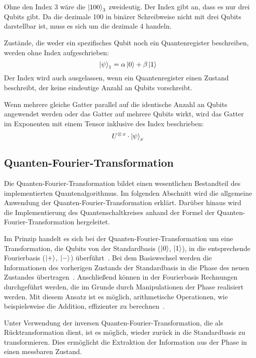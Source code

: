 Ohne den Index 3 wäre die \(\ket{100}_3\) zweideutig. 
Der Index gibt an, dass es nur drei Qubits gibt. 
Da die dezimale 100 in binärer Schreibweise nicht mit drei Qubits darstellbar ist, 
muss es sich um die dezimale 4 handeln.

Zustände, die weder ein spezifisches Qubit noch ein Quantenregister beschreiben, 
werden ohne Index aufgeschrieben:
\[
  \ket{\psi}_1 = \alpha\ket{0} + \beta\ket{1}
  \]
Der Index wird auch ausgelassen, 
wenn ein Quantenregister einen Zustand beschreibt, 
der keine eindeutige Anzahl an Qubits vorschreibt.

\vspace{1em}

Wenn mehrere gleiche Gatter parallel auf die identische Anzahl an Qubits angewendet werden 
oder das Gatter auf mehrere Qubits wirkt, 
wird das Gatter im Exponenten mit einem Tensor inklusive des Index beschrieben:
\[
  U^{\operatorname{\otimes} x} \cdot 
  \ket{\psi}_x
\]


\subsection{Quanten-Fourier-Transformation} \label{Quanten-Fourier-Transformation}
Die Quanten-Fourier-Transformation bildet einen wesentlichen Bestandteil des implementierten Quantenalgorithmus. 
Im folgenden Abschnitt wird die allgemeine Anwendung der Quanten-Fourier-Transformation erklärt.
Darüber hinaus wird die Implementierung des Quantenschaltkreises anhand der Formel der Quanten-Fourier-Transformation hergeleitet.

Im Prinzip handelt es sich bei der Quanten-Fourier-Transformation um eine Transformation,
die Qubits von der Standardbasis (\(\ket{0}\), \(\ket{1}\)),
in die entsprechende Fourierbasis (\(\ket{+}\), \(\ket{-}\)) überführt~\cite[215]{homeister2023quantum215}.
Bei dem Basiswechsel werden die Informationen des vorherigen Zustands der Standardbasis in die Phase des neuen Zustandes übertragen~\cite{Ruiz-Perez2017}.
Anschließend können in der Fourierbasis Rechnungen durchgeführt werden, 
die im Grunde durch Manipulationen der Phase realisiert werden.
Mit diesem Ansatz ist es möglich, arithmetische Operationen, wie beispielsweise 
die Addition, effizienter zu berechnen~\cite{draper2000addition,Ruiz-Perez2017}.

Unter Verwendung der inversen Quanten-Fourier-Transformation, 
die als Rücktransformation dient, ist es möglich, 
wieder zurück in die Standardbasis zu transformieren. 
Dies ermöglicht die Extraktion der Information aus der Phase in einen messbaren Zustand.

